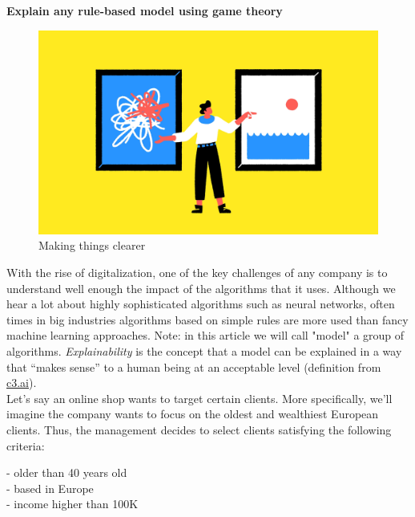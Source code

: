 {\fontsize{35pt}{50pt} \textbf{Explain any rule-based model using game theory}\par}

\vspace{10mm}

\begin{figure}[h]
\begin{center}
\includegraphics[scale=0.223]{./../img/make-things-clearer.png}
\caption{Making things clearer}
\end{center}
\end{figure}

With the rise of digitalization, one of the key challenges of any company is to understand well enough the impact of the algorithms that it uses. Although we hear a lot about highly sophisticated algorithms such as neural networks, often times in big industries algorithms based on simple rules are more used than fancy machine learning approaches. Note: in this article we will call "model" a group of algorithms. \textit{Explainability} is the concept that a model can be explained in a way that “makes sense” to a human being at an acceptable level (definition from \href{https://c3.ai/glossary/machine-learning/explainability/}{c3.ai}). \\

Let's say an online shop wants to target certain clients. More specifically, we'll imagine the company wants to focus on the oldest and wealthiest European clients. Thus, the management decides to select clients satisfying the following criteria: 

- older than 40 years old \\
- based in Europe \\
- income higher than 100K \\

